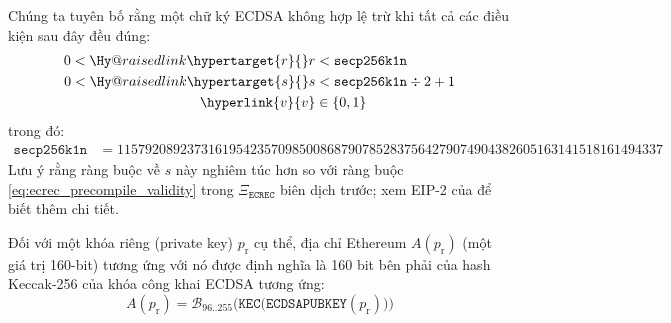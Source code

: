 \documentclass[9pt,oneside]{amsart}
\makeatletter
\newcommand{\linkdest}[1]{\Hy@raisedlink{\hypertarget{#1}{}}}
\makeatother
\begin{document}
\linkdest{invalidsig}Chúng ta tuyên bố rằng một chữ ký ECDSA không hợp lệ trừ khi tất cả các điều kiện sau đây đều đúng:
\begin{align}
0 < \linkdest{r}{r} &< \mathtt{secp256k1n} \\
0 < \linkdest{s}{s} &< \mathtt{secp256k1n} \div 2 + 1 \\
\hyperlink{v}{v} &\in \{0,1\}
\end{align}
trong đó:
\begin{align}
\mathtt{secp256k1n} &= 115792089237316195423570985008687907852837564279074904382605163141518161494337
\end{align}
Lưu ý rằng ràng buộc về $s$ này nghiêm túc hơn so với ràng buộc \ref{eq:ecrec_precompile_validity} trong $\Xi_{\mathtt{ECREC}}$ biên dịch trước; xem EIP-2 của \cite{EIP-2} để biết thêm chi tiết.

Đối với một khóa riêng (private key) $p_{\mathrm{r}}$ cụ thể, địa chỉ Ethereum $A(p_{\mathrm{r}})$ (một giá trị 160-bit) tương ứng với nó được định nghĩa là 160 bit bên phải của hash Keccak-256 của khóa công khai ECDSA tương ứng:
\begin{equation}
A(p_{\mathrm{r}}) = \mathcal{B}_{96..255}\big(\mathtt{KEC}\big( \mathtt{ECDSAPUBKEY}(p_{\mathrm{r}}) \big) \big)
\end{equation}
\end{document}
